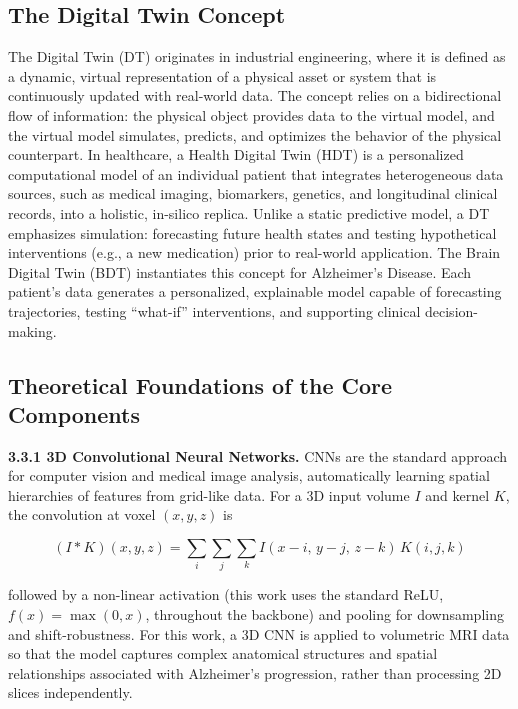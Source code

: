 \documentclass[pdflatex,sn-mathphys-num]{sn-jnl}%
\theoremstyle{thmstyleone}%
\theoremstyle{thmstyletwo}%
\theoremstyle{thmstylethree}%
\begin{document}
\subsection{The Digital Twin Concept}\label{sec3_2}

The Digital Twin (DT) originates in industrial engineering, where it is defined as a dynamic, virtual representation of a physical asset or system that is continuously updated with real-world data. The concept relies on a bidirectional flow of information: the physical object provides data to the virtual model, and the virtual model simulates, predicts, and optimizes the behavior of the physical counterpart. In healthcare, a Health Digital Twin (HDT) is a personalized computational model of an individual patient that integrates heterogeneous data sources, such as medical imaging, biomarkers, genetics, and longitudinal clinical records, into a holistic, in-silico replica. Unlike a static predictive model, a DT emphasizes simulation: forecasting future health states and testing hypothetical interventions (e.g., a new medication) prior to real-world application. The Brain Digital Twin (BDT) instantiates this concept for Alzheimer's Disease. Each patient's data generates a personalized, explainable model capable of forecasting trajectories, testing ``what-if'' interventions, and supporting clinical decision-making.

\subsection{Theoretical Foundations of the Core Components}\label{sec3_3}

\textbf{3.3.1 3D Convolutional Neural Networks.} CNNs are the standard approach for computer vision and medical image analysis, automatically learning spatial hierarchies of features from grid-like data. For a 3D input volume $I$ and kernel $K$, the convolution at voxel $(x,y,z)$ is

\begin{equation}
(I * K)(x,y,z) = \sum_i \sum_j \sum_k I(x-i,\, y-j,\, z-k)\, K(i,j,k)
\label{eq1}
\end{equation}

followed by a non-linear activation (this work uses the standard ReLU, $f(x) = \max(0, x)$, throughout the backbone) and pooling for downsampling and shift-robustness. For this work, a 3D CNN is applied to volumetric MRI data so that the model captures complex anatomical structures and spatial relationships associated with Alzheimer's progression, rather than processing 2D slices independently.
\end{document}
